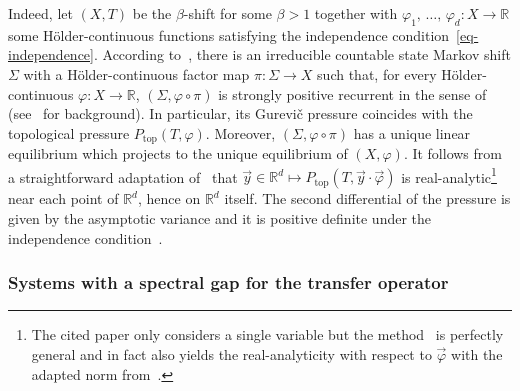 \documentclass[AHL, Unicode, longabstracts,published]{cedram}
\theoremstyle{plain}
\theoremstyle{plain}
\renewcommand\top{{\mathrm{top}}}
\newcommand{\pot}{\varphi}
\newcounter{In}
\newcommand*\8{\infty}
\newcommand\RR{\mathbb{R}}
\begin{document}
Indeed, let $(X,T)$ be the $\beta$-shift for some $\beta>1$ together with $ \varphi_1,\,\dots,\,\varphi_d:X\to\RR$ some H\"older-continuous functions satisfying the independence condition~\eqref{eq-independence}. According to~\cite[Theorem~1.2 and Example~1.5]{Climenhaga-2018-towers}, there is an irreducible countable state Markov shift $\Sigma$ with a H\"older-continuous factor map $\pi:\Sigma\to X$ such that, for every H\"older-continuous $\varphi:X\to\RR$, $(\Sigma, \varphi\circ\pi)$ is strongly positive recurrent in the sense of~\cite{Sarig-2001-PhaseTransitions} (see~\cite{Sarig-2015-thermo} for background). In particular, its Gurevič pressure coincides with the topological pressure $P_\top(T, \varphi)$. Moreover, $(\Sigma,\varphi\circ\pi)$ has a unique linear equilibrium which projects to the unique equilibrium of $(X, \varphi)$. It follows from a straightforward adaptation of~\cite{Cyr-Sarig-2009} that $\vec y\in\RR^d\mapsto P_\top(T,\vec y\cdot\vec\pot)$ is real-analytic\footnote{The cited paper only considers a single variable but the method~\cite[end of Section~3.1]{Cyr-Sarig-2009} is perfectly general and in fact also yields the real-analyticity with respect to $\vec\pot$ with the adapted norm from~\cite{Cyr-Sarig-2009}.} near each point of $\RR^d$, hence on $\RR^d$ itself. The second differential of the pressure is given by the asymptotic variance and it is positive definite under the independence condition~\cite[Theorems~6.4~and~6.5]{Sarig-2015-thermo}.



\subsubsection{Systems with a spectral gap for the transfer operator}
\end{document}
